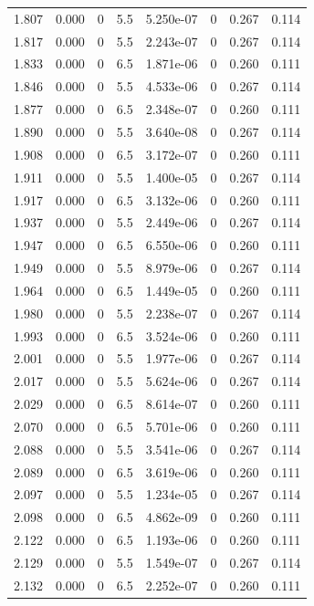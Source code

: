 \documentclass[preview]{standalone}
\begin{document}
{{{{{\begin{tabular}{L{1.2cm}C{1.2cm} C{0.3cm}C{0.5cm} C{1.4cm}C{1.4cm} C{1.4cm}C{1.4cm}}
  1.807  &  0.000  & 0     & 5.5 &  5.250e-07  & 0  & 0.267 &  0.114   \\ 
  1.817  &  0.000  & 0     & 5.5 &  2.243e-07  & 0  & 0.267 &  0.114   \\ 
  1.833  &  0.000  & 0     & 6.5 &  1.871e-06  & 0  & 0.260 &  0.111   \\ 
  1.846  &  0.000  & 0     & 5.5 &  4.533e-06  & 0  & 0.267 &  0.114   \\ 
  1.877  &  0.000  & 0     & 6.5 &  2.348e-07  & 0  & 0.260 &  0.111   \\ 
  1.890  &  0.000  & 0     & 5.5 &  3.640e-08  & 0  & 0.267 &  0.114   \\ 
  1.908  &  0.000  & 0     & 6.5 &  3.172e-07  & 0  & 0.260 &  0.111   \\ 
  1.911  &  0.000  & 0     & 5.5 &  1.400e-05  & 0  & 0.267 &  0.114   \\ 
  1.917  &  0.000  & 0     & 6.5 &  3.132e-06  & 0  & 0.260 &  0.111   \\ 
  1.937  &  0.000  & 0     & 5.5 &  2.449e-06  & 0  & 0.267 &  0.114   \\ 
  1.947  &  0.000  & 0     & 6.5 &  6.550e-06  & 0  & 0.260 &  0.111   \\ 
  1.949  &  0.000  & 0     & 5.5 &  8.979e-06  & 0  & 0.267 &  0.114   \\ 
  1.964  &  0.000  & 0     & 6.5 &  1.449e-05  & 0  & 0.260 &  0.111   \\ 
  1.980  &  0.000  & 0     & 5.5 &  2.238e-07  & 0  & 0.267 &  0.114   \\ 
  1.993  &  0.000  & 0     & 6.5 &  3.524e-06  & 0  & 0.260 &  0.111   \\ 
  2.001  &  0.000  & 0     & 5.5 &  1.977e-06  & 0  & 0.267 &  0.114   \\ 
  2.017  &  0.000  & 0     & 5.5 &  5.624e-06  & 0  & 0.267 &  0.114   \\ 
  2.029  &  0.000  & 0     & 6.5 &  8.614e-07  & 0  & 0.260 &  0.111   \\ 
  2.070  &  0.000  & 0     & 6.5 &  5.701e-06  & 0  & 0.260 &  0.111   \\ 
  2.088  &  0.000  & 0     & 5.5 &  3.541e-06  & 0  & 0.267 &  0.114   \\ 
  2.089  &  0.000  & 0     & 6.5 &  3.619e-06  & 0  & 0.260 &  0.111   \\ 
  2.097  &  0.000  & 0     & 5.5 &  1.234e-05  & 0  & 0.267 &  0.114   \\ 
  2.098  &  0.000  & 0     & 6.5 &  4.862e-09  & 0  & 0.260 &  0.111   \\ 
  2.122  &  0.000  & 0     & 6.5 &  1.193e-06  & 0  & 0.260 &  0.111   \\ 
  2.129  &  0.000  & 0     & 5.5 &  1.549e-07  & 0  & 0.267 &  0.114   \\ 
  2.132  &  0.000  & 0     & 6.5 &  2.252e-07  & 0  & 0.260 &  0.111   \\ 
\hline 
\end{tabular} 

}}}}}
\end{document}
